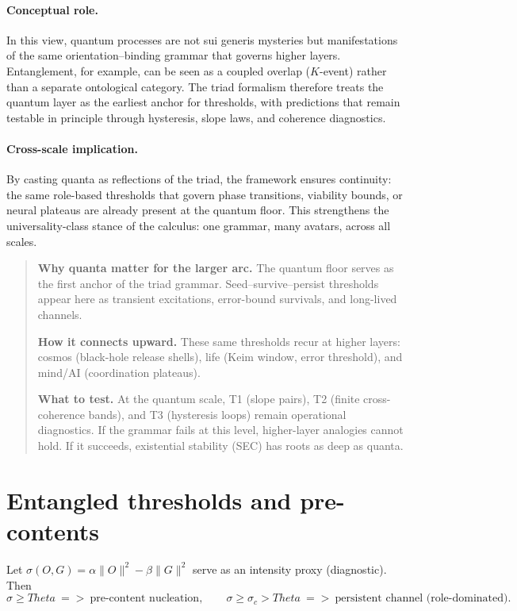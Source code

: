 \documentclass[12pt,a4paper,oneside]{scrreprt}
\def\Theta{Theta}%
\def\Rightarrow{=>}%
\newenvironment{roadmap}{%
  \begin{quote}\setlength{\parskip}{0.5\baselineskip}%
}{%
  \end{quote}
}
\begin{document}
\paragraph{Conceptual role.} 
In this view, quantum processes are not sui generis mysteries but 
manifestations of the same orientation–binding grammar that governs 
higher layers. 
Entanglement, for example, can be seen as a coupled overlap ($K$-event) 
rather than a separate ontological category. 
The triad formalism therefore treats the quantum layer as the earliest anchor 
for thresholds, with predictions that remain testable in principle through 
hysteresis, slope laws, and coherence diagnostics. 

\paragraph{Cross-scale implication.} 
By casting quanta as reflections of the triad, the framework ensures 
continuity: the same role-based thresholds that govern phase transitions, 
viability bounds, or neural plateaus are already present at the quantum floor. 
This strengthens the universality-class stance of the calculus: 
one grammar, many avatars, across all scales.

\begin{roadmap}
\textbf{Why quanta matter for the larger arc.}  
The quantum floor serves as the first anchor of the triad grammar.  
Seed–survive–persist thresholds appear here as transient excitations, 
error-bound survivals, and long-lived channels.  

\textbf{How it connects upward.}  
These same thresholds recur at higher layers:  
cosmos (black-hole release shells),  
life (Keim window, error threshold),  
and mind/AI (coordination plateaus).  

\textbf{What to test.}  
At the quantum scale, T1 (slope pairs), T2 (finite cross-coherence bands), 
and T3 (hysteresis loops) remain operational diagnostics.  
If the grammar fails at this level, higher-layer analogies cannot hold.  
If it succeeds, existential stability (SEC) has roots as deep as quanta.
\end{roadmap}

\section{Entangled thresholds and pre-contents}\label{sec:quanta-thresholds}

Let $\sigma(O,G)=\alpha \|O\|^2 - \beta \|G\|^2$ serve as an intensity proxy (diagnostic). Then
\[
\sigma \ge \Theta \ \Rightarrow \ \text{pre-content nucleation}, 
\qquad
\sigma \ge \sigma_c > \Theta \ \Rightarrow \ \text{persistent channel (role-dominated)}.
\]
\end{document}
